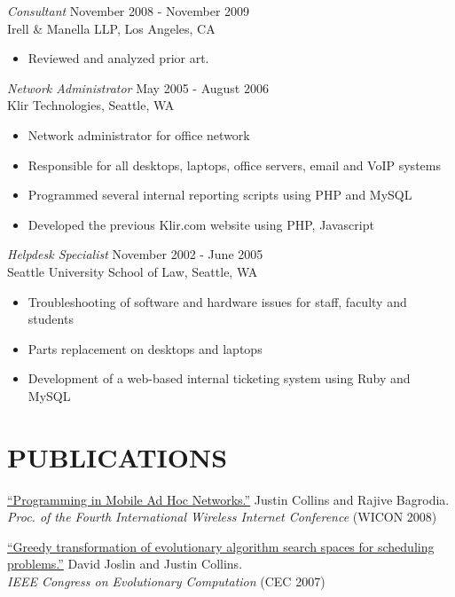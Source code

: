 \documentclass[margin]{res}
\begin{document}
\begin{resume}
		{\sl Consultant} \hfill November 2008 - November 2009 \\
		Irell \& Manella LLP, Los Angeles, CA
                 \begin{itemize}  \itemsep -2pt %
                \item Reviewed and analyzed prior art.
                \end{itemize}

		{\sl Network Administrator} \hfill May 2005 - August 2006 \\
                Klir Technologies, Seattle, WA 
                 \begin{itemize}  \itemsep -2pt %
                \item Network administrator for office network
		\item Responsible for all desktops, laptops, office servers, email and VoIP systems
		\item Programmed several internal reporting scripts using PHP and MySQL
		\item Developed the previous Klir.com website using PHP, Javascript
                \end{itemize}

		{\sl Helpdesk Specialist} \hfill November 2002 - June 2005 \\
                Seattle University School of Law, Seattle, WA 
                 \begin{itemize}  \itemsep -2pt %
                \item Troubleshooting of software and hardware issues for staff, faculty and students
		\item Parts replacement on desktops and laptops
		\item Development of a web-based internal ticketing system using Ruby and MySQL
                \end{itemize}

\section{PUBLICATIONS}
		\href{http://cs.ucla.edu/~collins/documents/Justin_Collins-WICON08.pdf}{``Programming in Mobile Ad Hoc Networks.''} Justin Collins and Rajive Bagrodia. \\
		{\it Proc. of the Fourth International Wireless Internet Conference} (WICON 2008)

		\href{http://cs.ucla.edu/~collins/documents/Joslin_Collins-Greedy_Transformations_of_Search_Spaces.pdf}{``Greedy transformation of evolutionary algorithm search spaces for scheduling problems.''} David Joslin and Justin Collins.\\
		{\it IEEE Congress on Evolutionary Computation} (CEC 2007)


\end{resume}
\end{document}
